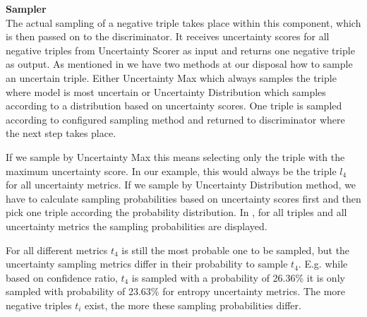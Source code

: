 \textbf{Sampler} \\
The actual sampling of a negative triple takes place within this component, which is then passed on to the discriminator.
It receives uncertainty scores for all negative triples from Uncertainty Scorer as input and returns one negative triple as output.
As mentioned in  we have two methods at our disposal how to sample an uncertain triple.
Either Uncertainty Max which always samples the triple where model is most uncertain or Uncertainty Distribution which samples according to a distribution based on uncertainty scores.
One triple is sampled according to configured sampling method and returned to discriminator where the next step takes place.

If we sample by Uncertainty Max this means selecting only the triple with the maximum uncertainty score.
In our example, this would always be the triple $l_4$ for all uncertainty metrics.
If we sample by Uncertainty Distribution method, we have to calculate sampling probabilities based on uncertainty scores first and then pick one triple according the probability distribution.
In , for all triples and all uncertainty metrics the sampling probabilities are displayed.

For all different metrics $t_4$ is still the most probable one to be sampled, but the uncertainty sampling metrics differ in their probability to sample $t_4$.
E.g. while based on confidence ratio, $t_4$ is sampled with a probability of 26.36\% it is only sampled with probability of 23.63\% for entropy uncertainty metrics.
The more negative triples $t_i$ exist, the more these sampling probabilities differ.




